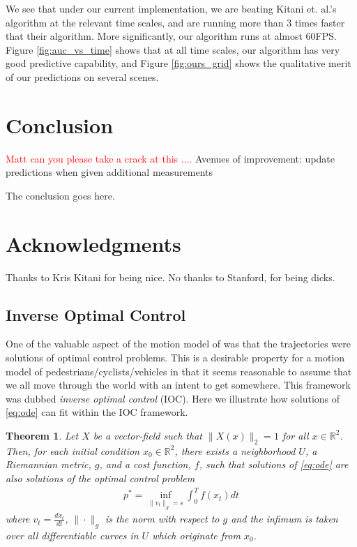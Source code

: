 \documentclass[letterpaper,10pt,conference]{ieeeconf}
\newtheorem{thm}{Theorem}
\newcommand{\Ram}[1]{\textcolor{red}{#1}}
\begin{document}
We see that under our current implementation, we are beating Kitani et. al.'s algorithm at the relevant time scales, and are running more than 3 times faster that their algorithm. More significantly, our algorithm runs at almost 60FPS. Figure \ref{fig:auc_vs_time} shows that at all time scales, our algorithm has very good predictive capability, and Figure \ref{fig:ours_grid} shows the qualitative merit of our predictions on several scenes.



\section{Conclusion} 
\label{sec:conclusion}

\Ram{Matt can you please take a crack at this ....}
Avenues of improvement:
update predictions when given additional measurements

The conclusion goes here.

\section*{Acknowledgments}
Thanks to Kris Kitani for being nice.  No thanks to Stanford, for being dicks.

\appendix
\subsection{Inverse Optimal Control} \label{app:ioc}
One of the valuable aspect of the motion model of \cite{Kitani2012} was that the trajectories were solutions of optimal control problems.
This is a desirable property for a motion model of pedestrians/cyclists/vehicles in that it seems reasonable to assume that we all move through the world with an intent to get somewhere.
This framework was dubbed \emph{inverse optimal control} (IOC).
Here we illustrate how solutions of \eqref{eq:ode} can fit within the IOC framework.

\begin{thm}
	Let $X$ be a vector-field such that $\| X(x) \|_2 = 1$ for all $x \in \mathbb{R}^2$.
Then, for each initial condition $x_0 \in \mathbb{R}^2$, there exists a neighborhood $U$, a Riemannian metric, $g$, and a cost function, $f$, 
such that solutions of \eqref{eq:ode} are also solutions of the optimal control problem
\begin{align}
	p^* = \inf_{ \| v_t \|_g = s } \int_0^T f( x_t) dt \label{eq:IOC}
\end{align}
where $v_t = \frac{d x_t}{dt}$, $\| \cdot \|_g$ is the norm with respect to $g$ and the infimum is taken over all differentiable curves in $U$ which originate from $x_0$.
\end{thm}
\end{document}
